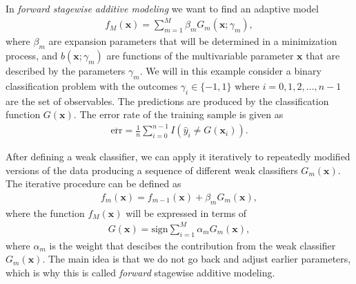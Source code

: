 In \textit{forward stagewise additive modeling} we want to find an adaptive model
\begin{align}
  f_M (\boldsymbol{x}) = \sum_{m=1}^M \beta_m G_m(\boldsymbol{x}; \gamma_m),
\end{align}
where $\beta_m$ are expansion parameters that will be determined in a minimization process, and $b(\boldsymbol{x};\gamma_m)$ are functions of the multivariable parameter $\boldsymbol{x}$ that are described by the parameters $\gamma_m$. We will in this example consider a binary classification problem with the outcomes $\gamma_i \in \{-1,1\}$ where $i=0,1,2,...,n-1$ are the set of observables. The predictions are produced by the classification function $G(\boldsymbol{x})$. The error rate of the training sample is given as
\begin{align}
  \overline{\text{err}} = \frac{1}{n} \sum_{i=0}^{n-1} I(\hat{y}_i \neq G(\boldsymbol{x}_i)).
\end{align}

\noindent After defining a weak classifier, we can apply it iteratively to repeatedly modified versions of the data producing a sequence of different weak classifiers $G_m(\boldsymbol{x})$. The iterative procedure can be defined as
\begin{align}
  f_m(\boldsymbol{x}) = f_{m-1}(\boldsymbol{x}) + \beta_mG_m(\boldsymbol{x}),
  \label{eq:fsam}
\end{align}
where the function $f_M(\boldsymbol{x})$ will be expressed in terms of
\begin{align}
  G(\boldsymbol{x})=\text{sign}\sum_{i=1}^M \alpha_mG_m(\boldsymbol{x}),
\end{align}
where $\alpha_m$ is the weight that descibes the contribution from the weak classifier $G_m(\boldsymbol{x})$.
The main idea is that we do not go back and adjust earlier parameters, which is why this is called \textit{forward} stagewise additive modeling.

